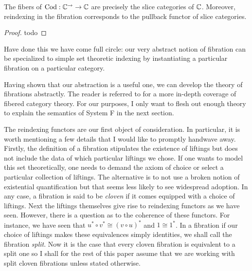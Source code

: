 \begin{lem}\label{lem:fibrations:fibersareslices}
  The fibers of $\operatorname{Cod} : \mathbb{C}^{\to} \to \mathbb{C}$ are precisely the slice
  categories of $\mathbb{C}$. Moreover, reindexing in the fibration
  corresponds to the pullback functor of slice categories.
\end{lem}
\begin{proof}
  todo
\end{proof}

Have done this we have come full circle: our very abstract notion of
fibration can be specialized to simple set theoretic indexing by
instantiating a particular fibration on a particular category.

Having shown that our abstraction is a useful one, we can develop the
theory of fibrations abstractly. The reader is referred to
\citet{Jacobs:01} for a more in-depth coverage of fibered category
theory. For our purposes, I only want to flesh out enough theory to
explain the semantics of System F in the next section.

The reindexing functors are our first object of consideration. In
particular, it is worth mentioning a few details that I would like to
promptly handwave away. Firstly, the definition of a fibration
stipulates the existence of liftings but does not include the data of
which particular liftings we chose. If one wants to model this set
theoretically, one needs to demand the axiom of choice or select a
particular collection of liftings. The alternative is to not use a
broken notion of existential quantification but that seems less likely
to see widespread adoption. In any case, a fibration is said to be
\emph{cloven} if it comes equipped with a choice of liftings. Next the
liftings themselves give rise to reindexing functors as we have
seen. However, there is a question as to the coherence of these
functors. For instance, we have seen that
$u^* \circ v^* \cong (v \circ u)^*$ and $1 \cong 1^*$. In a fibration
if our choice of liftings makes these equivalences simply identities,
we shall call the fibration \emph{split}. Now it is the case that
every cloven fibration is equivalent to a split one so I shall for the
rest of this paper assume that we are working with split cloven
fibrations unless stated otherwise.

